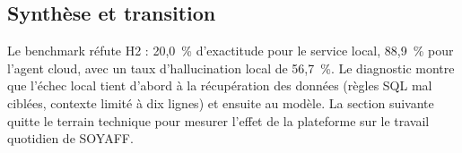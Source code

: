 \subsection{Synthèse et transition}

Le benchmark réfute H2 : 20,0~\% d'exactitude pour le service local, 88,9~\% pour l'agent cloud, avec un taux d'hallucination local de 56,7~\%. Le diagnostic montre que l'échec local tient d'abord à la récupération des données (règles SQL mal ciblées, contexte limité à dix lignes) et ensuite au modèle. La section suivante quitte le terrain technique pour mesurer l'effet de la plateforme sur le travail quotidien de SOYAFF.
